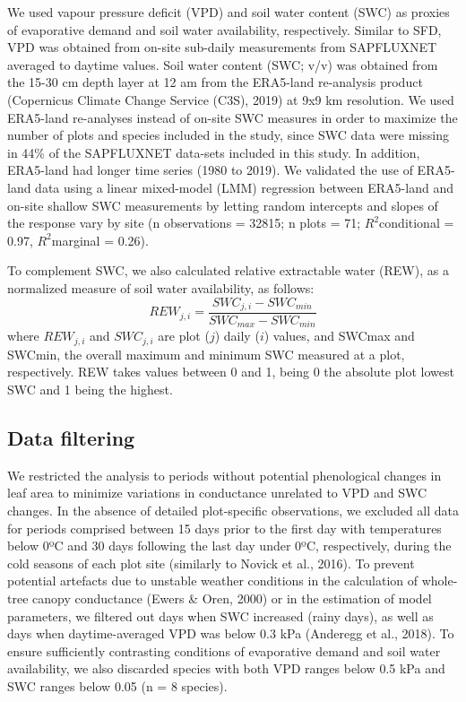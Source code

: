 \documentclass[11pt,twoside]{reedthesis}
\begin{document}
We used vapour pressure deficit (VPD) and soil water content (SWC) as
proxies of evaporative demand and soil water availability, respectively.
Similar to SFD, VPD was obtained from on-site sub-daily measurements
from SAPFLUXNET averaged to daytime values. Soil water content (SWC;
v/v) was obtained from the 15-30 cm depth layer at 12 am from the
ERA5-land re-analysis product (Copernicus Climate Change Service (C3S),
2019) at 9x9 km resolution. We used ERA5-land re-analyses instead of
on-site SWC measures in order to maximize the number of plots and
species included in the study, since SWC data were missing in 44\% of
the SAPFLUXNET data-sets included in this study. In addition, ERA5-land
had longer time series (1980 to 2019). We validated the use of ERA5-land
data using a linear mixed-model (LMM) regression between ERA5-land and
on-site shallow SWC measurements by letting random intercepts and slopes
of the response vary by site (n observations = 32815; n plots = 71;
\(R^2\)conditional = 0.97, \(R^2\)marginal = 0.26).\par

To complement SWC, we also calculated relative extractable water (REW),
as a normalized measure of soil water availability, as follows:
\begin{equation}
REW_{j,i} = \frac{SWC_{j,i} - SWC_{min}}{SWC_{max} - SWC_{min}}
\end{equation}
where \(REW_{j,i}\) and \(SWC_{j,i}\) are plot (\(j\)) daily (\(i\))
values, and SWCmax and SWCmin, the overall maximum and minimum SWC
measured at a plot, respectively. REW takes values between 0 and 1,
being 0 the absolute plot lowest SWC and 1 being the highest.\par

\subsection{Data filtering}\label{data-filtering}

We restricted the analysis to periods without potential phenological
changes in leaf area to minimize variations in conductance unrelated to
VPD and SWC changes. In the absence of detailed plot-specific
observations, we excluded all data for periods comprised between 15 days
prior to the first day with temperatures below 0ºC and 30 days following
the last day under 0ºC, respectively, during the cold seasons of each
plot site (similarly to Novick et al., 2016). To prevent potential
artefacts due to unstable weather conditions in the calculation of
whole-tree canopy conductance (Ewers \& Oren, 2000) or in the estimation
of model parameters, we filtered out days when SWC increased (rainy
days), as well as days when daytime-averaged VPD was below 0.3 kPa
(Anderegg et al., 2018). To ensure sufficiently contrasting conditions
of evaporative demand and soil water availability, we also discarded
species with both VPD ranges below 0.5 kPa and SWC ranges below 0.05 (n
= 8 species).\par
\end{document}
